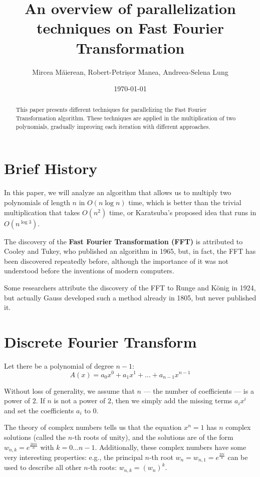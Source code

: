 \documentclass[12pt]{article}
\title{An overview of parallelization techniques on Fast Fourier Transformation}
\author{Mircea Măierean, Robert-Petrișor Manea, Andreea-Selena Lung}
\date{\today}
\theoremstyle{definition}
\begin{document}
\maketitle

\begin{abstract}
This paper presents different techniques for parallelizing the Fast Fourier Transformation algorithm. These techniques are applied in the multiplication of two polynomials, gradually improving each iteration with different approaches.
\end{abstract}

\tableofcontents


\section{Brief History}

In this paper, we will analyze an algorithm that allows us to multiply two polynomials of length $n$ in $O(n \log n)$ time, which is better than the trivial multiplication that takes $O(n^2)$ time, or Karatsuba's proposed idea that runs in $O(n^ {\log 3})$.

The discovery of the \textbf{Fast Fourier Transformation (FFT)} is attributed to Cooley and Tukey, who published an algorithm in 1965, but, in fact, the FFT has been discovered repeatedly before, although the importance of it was not understood before the inventions of modern computers.

Some researchers attribute the discovery of the FFT to Runge and König in 1924, but actually Gauss developed such a method already in 1805, but never published it.

\section{Discrete Fourier Transform}

Let there be a polynomial of degree \( n - 1 \): 
\[
A(x) = a_0 x^0 + a_1 x^1 + \dots + a_{n-1} x^{n-1}
\]

Without loss of generality, we assume that \( n \) — the number of coefficients — is a power of \( 2 \). If \( n \) is not a power of \( 2 \), then we simply add the missing terms \( a_i x^i \) and set the coefficients \( a_i \) to \( 0 \).

The theory of complex numbers tells us that the equation \( x^n = 1 \) has \( n \) complex solutions (called the \( n \)-th roots of unity), and the solutions are of the form \( w_{n, k} = e^{\frac{2 k \pi i}{n}} \) with \( k = 0 \dots n-1 \). Additionally, these complex numbers have some very interesting properties:
e.g., the principal \( n \)-th root \( w_n = w_{n, 1} = e^{\frac{2 \pi i}{n}} \) can be used to describe all other \( n \)-th roots: \( w_{n, k} = (w_n)^k \).
\end{document}
